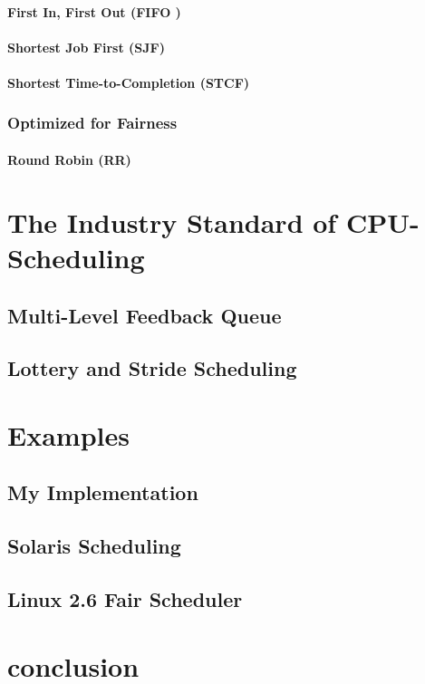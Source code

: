 \documentclass{report}
\begin{document}
\subsection{First In, First Out (FIFO )}

\subsection{Shortest Job First (SJF)}

\subsection{Shortest Time-to-Completion (STCF)}

\section{Optimized for Fairness}

\subsection{Round Robin (RR)}





\part{The Industry Standard of CPU-Scheduling}

\chapter{Multi-Level Feedback Queue}

\chapter{Lottery and Stride Scheduling}

\part{Examples}

\chapter{My Implementation}

\chapter{Solaris Scheduling}

\chapter{Linux 2.6 Fair Scheduler}



\part{conclusion}
\end{document}
